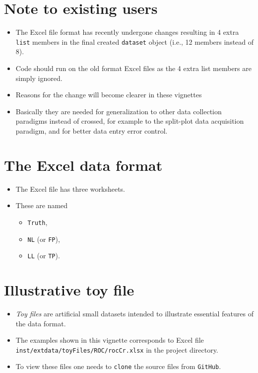\documentclass[
]{book}
\providecommand{\tightlist}{%
  \setlength{\itemsep}{0pt}\setlength{\parskip}{0pt}}
\begin{document}
\hypertarget{note-to-existing-users}{%
\section{Note to existing users}\label{note-to-existing-users}}

\begin{itemize}
\tightlist
\item
  The Excel file format has recently undergone changes resulting in 4 extra \texttt{list} members in the final created \texttt{dataset} object (i.e., 12 members instead of 8).
\item
  Code should run on the old format Excel files as the 4 extra list members are simply ignored.
\item
  Reasons for the change will become clearer in these vignettes
\item
  Basically they are needed for generalization to other data collection paradigms instead of crossed, for example to the split-plot data acquisition paradigm, and for better data entry error control.
\end{itemize}

\hypertarget{the-excel-data-format}{%
\section{The Excel data format}\label{the-excel-data-format}}

\begin{itemize}
\tightlist
\item
  The Excel file has three worksheets.
\item
  These are named

  \begin{itemize}
  \tightlist
  \item
    \texttt{Truth},
  \item
    \texttt{NL} (or \texttt{FP}),
  \item
    \texttt{LL} (or \texttt{TP}).
  \end{itemize}
\end{itemize}

\hypertarget{illustrative-toy-file}{%
\section{Illustrative toy file}\label{illustrative-toy-file}}

\begin{itemize}
\tightlist
\item
  \emph{Toy files} are artificial small datasets intended to illustrate essential features of the data format.\\
\item
  The examples shown in this vignette corresponds to Excel file \texttt{inst/extdata/toyFiles/ROC/rocCr.xlsx} in the project directory.
\item
  To view these files one needs to \texttt{clone} the source files from \texttt{GitHub}.
\end{itemize}
\end{document}
